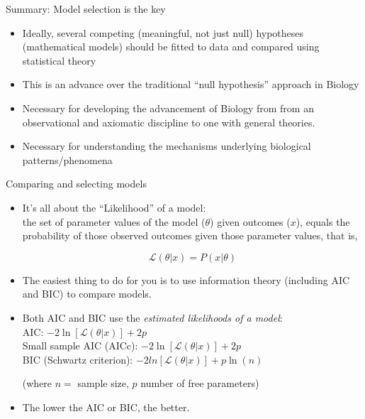 \documentclass[xcolor=x11names,compress]{beamer}
\renewcommand{\(}{\begin{columns}}
\renewcommand{\)}{\end{columns}}
\newcommand{\<}[1]{\begin{column}{#1}}
\renewcommand{\>}{\end{column}}
\begin{document}
\begin{frame}{Summary: Model selection is the key}

\begin{itemize}[<+->]\itemsep12pt
	\item Ideally, several competing (meaningful, not just null) hypotheses (mathematical models) should be fitted to data and compared using statistical theory 
	\item This is an advance over the traditional ``null hypothesis'' approach in Biology
	\item Necessary for developing the advancement of Biology from from an observational and axiomatic discipline to one with general theories.
	\item Necessary for understanding the mechanisms underlying biological patterns/phenomena
\end{itemize}
 
 \end{frame}


\begin{frame}{Comparing and selecting models}

\begin{itemize}
	
	\item It's all about the ``Likelihood'' of a model: \\
	the set of parameter values of the	model ($\theta$) given outcomes ($x$),
	equals the probability of those observed outcomes given those parameter
	values, that is,

	$$ \mathcal{L}(\theta |x) = P(x | \theta)$$

	\item The easiest thing to do for you is to use information theory
	(including AIC and BIC) to compare models. 

	\item Both AIC and BIC use the {\it estimated likelihoods of a model}:\\
	
	AIC: $-2 \ln[\mathcal{L}(\theta |x)] + 2p$\\

	Small sample AIC (AICc): $-2 \ln[\mathcal{L}(\theta |x)] + 2p$\\
	
	BIC (Schwartz criterion): $-2 ln[\mathcal{L}(\theta |x) ] + p \ln(n)$
	
		(where $n = $ sample size, $p$ number of free parameters)
	\item The lower the AIC or BIC, the better. 

\end{itemize}

\end{frame}
\end{document}
